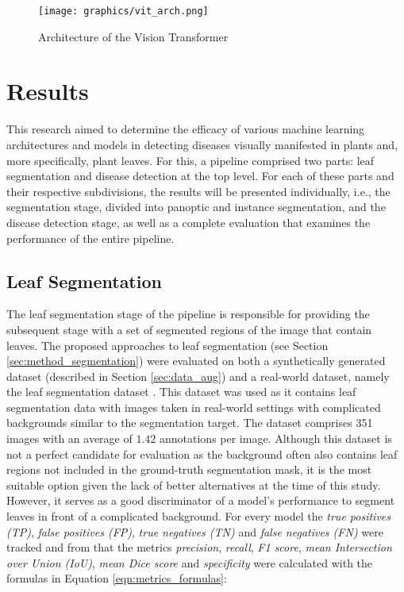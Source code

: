 \documentclass[draft,final]{vutinfth} %
\begin{document}
\begin{figure}[ht]
    \centering
    \texttt{[image: graphics/vit\_arch.png]}
    \caption{Architecture of the Vision Transformer \cite{wolfe_using_2022}}
    \label{fig:vit_arch}
\end{figure}

\chapter{Results} \label{sec:results}
This research aimed to determine the efficacy of various machine learning architectures and models in detecting diseases visually manifested in plants and, more specifically, plant leaves. For this, a pipeline comprised two parts: leaf segmentation and disease detection at the top level. For each of these parts and their respective subdivisions, the results will be presented individually, i.e., the segmentation stage, divided into panoptic and instance segmentation, and the disease detection stage, as well as a complete evaluation that examines the performance of the entire pipeline.

\section{Leaf Segmentation} \label{sec:results_segmentation}
The leaf segmentation stage of the pipeline is responsible for providing the subsequent stage with a set of segmented regions of the image that contain leaves. The proposed approaches to leaf segmentation (see Section \ref{sec:method_segmentation}) were evaluated on both a synthetically generated dataset (described in Section \ref{sec:data_aug}) and a real-world dataset, namely the leaf segmentation dataset \cite{giovi_leaf_2024}.
This dataset was used as it contains leaf segmentation data with images taken in real-world settings with complicated backgrounds similar to the segmentation target. The dataset comprises 351 images with an average of $1.42$ annotations per image. Although this dataset is not a perfect candidate for evaluation as the background often also contains leaf regions not included in the ground-truth segmentation mask, it is the most suitable option given the lack of better alternatives at the time of this study. However, it serves as a good discriminator of a model's performance to segment leaves in front of a complicated background. 
For every model the \textit{true positives (TP)}, \textit{false positives (FP)}, \textit{true negatives (TN)} and \textit{false negatives (FN)} were tracked and from that the metrics \textit{precision}, \textit{recall}, \textit{F1 score}, \textit{mean Intersection over Union (IoU)}, \textit{mean Dice score} and \textit{specificity} were calculated with the formulas in Equation \eqref{eqn:metrics_formulas}:
\end{document}

